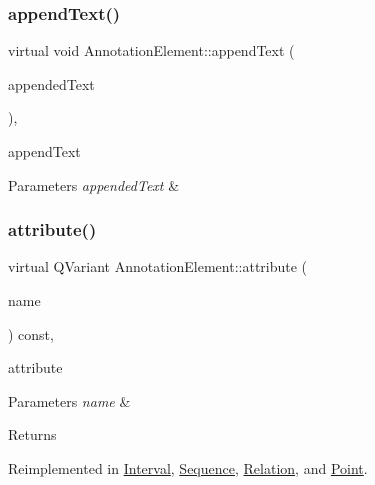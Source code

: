 \subsubsection{\texorpdfstring{append\+Text()}{appendText()}}
{\footnotesize\ttfamily virtual void Annotation\+Element\+::append\+Text (\begin{DoxyParamCaption}\item[{const Q\+String \&}]{appended\+Text }\end{DoxyParamCaption})\hspace{0.3cm}{\ttfamily [inline]}, {\ttfamily [virtual]}}



append\+Text 


\begin{DoxyParams}{Parameters}
{\em appended\+Text} & \\
\hline
\end{DoxyParams}
\mbox{\label{class_annotation_element_a55f85fb15ed52122653b0769c857899c}} 
\subsubsection{\texorpdfstring{attribute()}{attribute()}}
{\footnotesize\ttfamily virtual Q\+Variant Annotation\+Element\+::attribute (\begin{DoxyParamCaption}\item[{const Q\+String \&}]{name }\end{DoxyParamCaption}) const\hspace{0.3cm}{\ttfamily [inline]}, {\ttfamily [virtual]}}



attribute 


\begin{DoxyParams}{Parameters}
{\em name} & \\
\hline
\end{DoxyParams}
\begin{DoxyReturn}{Returns}

\end{DoxyReturn}


Reimplemented in \hyperlink{class_interval_aebcaee36c1adf49669d8a0faa16a335f}{Interval}, \hyperlink{class_sequence_a415f655b5985fa47499a7f665ce7c2d4}{Sequence}, \hyperlink{class_relation_a424ac3f46c1a62f2f72592dcf10d1f1e}{Relation}, and \hyperlink{class_point_a0ff561e393cdf7475126b96de6106d12}{Point}.


